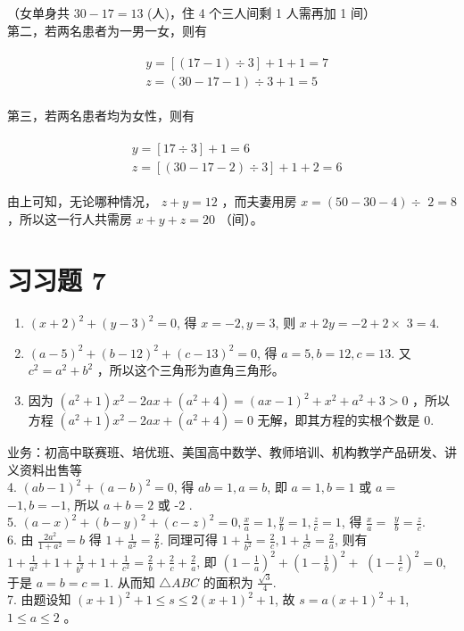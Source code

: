 \documentclass[10pt]{article}
\begin{document}
（女单身共 $30-17=13$ (人)，住 4 个三人间剩 1 人需再加 1 间）\\
第二，若两名患者为一男一女，则有

\begin{align*}
\begin{aligned}
& y=[(17-1) \div 3]+1+1=7 \\
& z=(30-17-1) \div 3+1=5
\end{aligned}
\end{align*}

第三，若两名患者均为女性，则有

\begin{align*}
\begin{aligned}
& y=[17 \div 3]+1=6 \\
& z=[(30-17-2) \div 3]+1+2=6
\end{aligned}
\end{align*}

由上可知，无论哪种情况， $z+y=12$ ，而夫妻用房 $x=(50-30-4) \div$ $2=8$ ，所以这一行人共需房 $x+y+z=20$ （间）。

\section*{习习题 7}
\begin{enumerate}
  \item $(x+2)^{2}+(y-3)^{2}=0$, 得 $x=-2, y=3$, 则 $x+2 y=-2+2 \times$ $3=4$.
  \item $(a-5)^{2}+(b-12)^{2}+(c-13)^{2}=0$, 得 $a=5, b=12, c=13$. 又 $c^{2}=a^{2}+b^{2}$ ，所以这个三角形为直角三角形。
  \item 因为 $\left(a^{2}+1\right) x^{2}-2 a x+\left(a^{2}+4\right)=(a x-1)^{2}+x^{2}+a^{2}+3>0$ ，所以方程 $\left(a^{2}+1\right) x^{2}-2 a x+\left(a^{2}+4\right)=0$ 无解，即其方程的实根个数是 0.
\end{enumerate}

业务：初高中联赛班、培优班、美国高中数学、教师培训、机构教学产品研发、讲义资料出售等\\
4. $(a b-1)^{2}+(a-b)^{2}=0$, 得 $a b=1, a=b$, 即 $a=1, b=1$ 或 $a=$ $-1, b=-1$, 所以 $a+b=2$ 或 -2 .\\
5. $(a-x)^{2}+(b-y)^{2}+(c-z)^{2}=0, \frac{x}{a}=1, \frac{y}{b}=1, \frac{z}{c}=1$, 得 $\frac{x}{a}=$ $\frac{y}{b}=\frac{z}{c}$.\\
6. 由 $\frac{2 a^{2}}{1+a^{2}}=b$ 得 $1+\frac{1}{a^{2}}=\frac{2}{b}$. 同理可得 $1+\frac{1}{b^{2}}=\frac{2}{c}, 1+\frac{1}{c^{2}}=\frac{2}{a}$, 则有 $1+\frac{1}{a^{2}}+1+\frac{1}{b^{2}}+1+\frac{1}{c^{2}}=\frac{2}{b}+\frac{2}{c}+\frac{2}{a}$, 即 $\left(1-\frac{1}{a}\right)^{2}+\left(1-\frac{1}{b}\right)^{2}+$ $\left(1-\frac{1}{c}\right)^{2}=0$, 于是 $a=b=c=1$. 从而知 $\triangle A B C$ 的面积为 $\frac{\sqrt{3}}{4}$.\\
7. 由题设知 $(x+1)^{2}+1 \leqslant s \leqslant 2(x+1)^{2}+1$, 故 $s=a(x+1)^{2}+1$, $1 \leqslant a \leqslant 2$ 。
\end{document}
